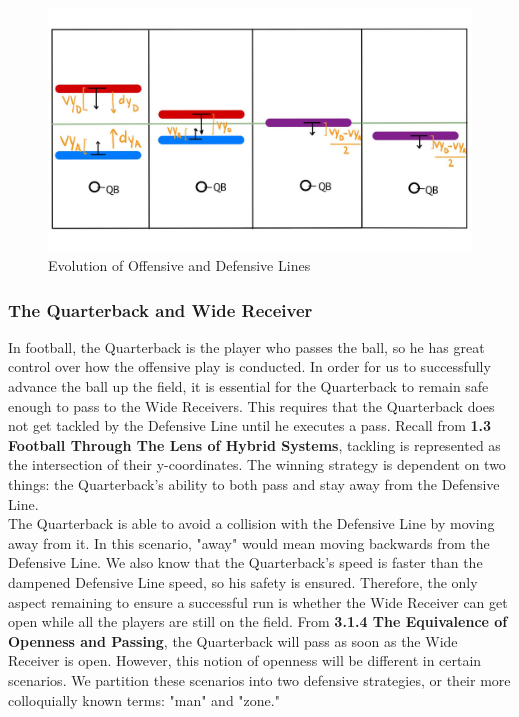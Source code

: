 \begin{figure}[htp]
    \centering
    \includegraphics[width=12.5cm]{figure/4_line_evolution.jpg}
    \caption{Evolution of Offensive and Defensive Lines}
\end{figure}

\subsubsection{The Quarterback and Wide Receiver} %

\quad In football, the Quarterback is the player who passes the ball, so he has great control over how the offensive play is conducted. In order for us to successfully advance the ball up the field, it is essential for the Quarterback to remain safe enough to pass to the Wide Receivers. This requires that the Quarterback does not get tackled by the Defensive Line until he executes a pass. Recall from \textbf{1.3 Football Through The Lens of Hybrid Systems}, tackling is represented as the intersection of their y-coordinates. The winning strategy is dependent on two things: the Quarterback’s ability to both pass and stay away from the Defensive Line. \\

The Quarterback is able to avoid a collision with the Defensive Line by moving away from it. In this scenario, "away" would mean moving backwards from the Defensive Line. We also know that the Quarterback's speed is faster than the dampened Defensive Line speed, so his safety is ensured. Therefore, the only aspect remaining to ensure a successful run is whether the Wide Receiver can get open while all the players are still on the field. From \textbf{3.1.4 The Equivalence of Openness and Passing}, the Quarterback will pass as soon as the Wide Receiver is open. However, this notion of openness will be different in certain scenarios. We partition these scenarios into two defensive strategies, or their more colloquially known terms: "man" and "zone." 

